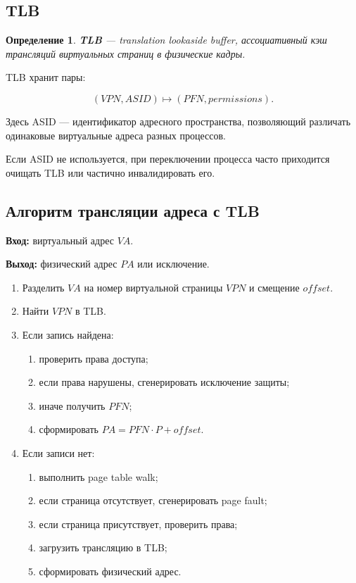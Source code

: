 \documentclass[a4paper,12pt]{article}
\newtheorem{definition}{Определение}
\begin{document}
\subsection{TLB}

\begin{definition}
\textbf{TLB} --- translation lookaside buffer, ассоциативный кэш трансляций виртуальных страниц в физические кадры.
\end{definition}

TLB хранит пары:

\[
(VPN, ASID) \mapsto (PFN, permissions).
\]

Здесь ASID --- идентификатор адресного пространства, позволяющий различать одинаковые виртуальные адреса разных процессов.

Если ASID не используется, при переключении процесса часто приходится очищать TLB или частично инвалидировать его.

\subsection{Алгоритм трансляции адреса с TLB}

\textbf{Вход:} виртуальный адрес $VA$.

\textbf{Выход:} физический адрес $PA$ или исключение.

\begin{enumerate}
    \item Разделить $VA$ на номер виртуальной страницы $VPN$ и смещение $offset$.
    \item Найти $VPN$ в TLB.
    \item Если запись найдена:
    \begin{enumerate}
        \item проверить права доступа;
        \item если права нарушены, сгенерировать исключение защиты;
        \item иначе получить $PFN$;
        \item сформировать $PA = PFN \cdot P + offset$.
    \end{enumerate}
    \item Если записи нет:
    \begin{enumerate}
        \item выполнить page table walk;
        \item если страница отсутствует, сгенерировать page fault;
        \item если страница присутствует, проверить права;
        \item загрузить трансляцию в TLB;
        \item сформировать физический адрес.
    \end{enumerate}
\end{enumerate}
\end{document}
